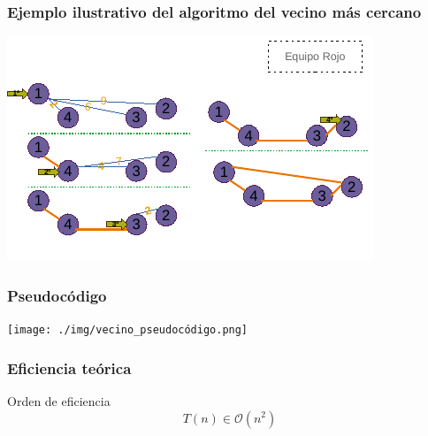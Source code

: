 \documentclass[13pt]{beamer}
\begin{document}
    \begin{frame}
		\frametitle{Ejemplo ilustrativo del algoritmo del vecino más cercano}
		\begin{center}
			\includegraphics[scale=1.5]{./img/DibVecCercano.pdf}
		\end{center}
	\end{frame}

	\begin{frame}
		\frametitle{Pseudocódigo}
		\begin{center}
			\texttt{[image: ./img/vecino\_pseudocódigo.png]}
		\end{center}
	\end{frame}

	\begin{frame}
		\frametitle{Eficiencia teórica}
		\begin{block}{Orden de eficiencia}
			$$T(n) \in \mathcal{O}(n^2)$$
		\end{block}
	\end{frame}
	
\end{document}
